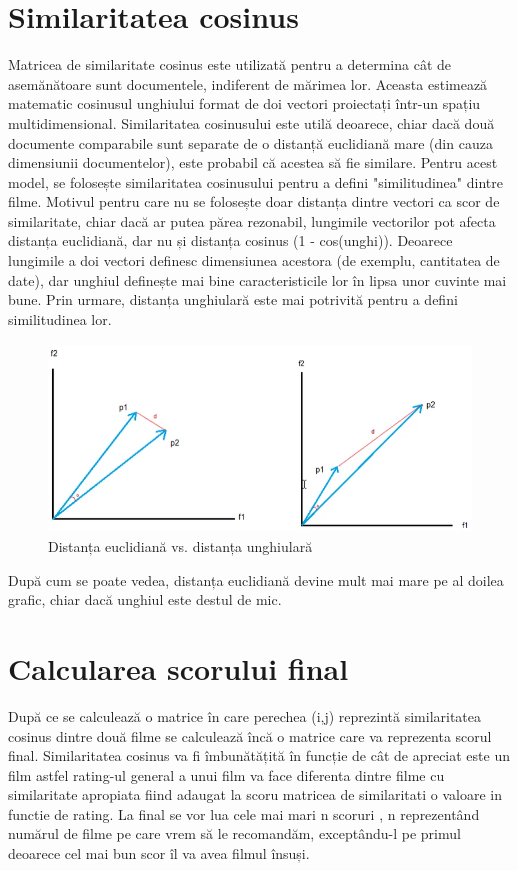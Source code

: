 \section{Similaritatea cosinus }
\par Matricea de similaritate cosinus este utilizată pentru a determina cât de asemănătoare sunt documentele, indiferent de mărimea lor. Aceasta estimează matematic cosinusul unghiului format de doi vectori proiectați într-un spațiu multidimensional. Similaritatea cosinusului este utilă deoarece, chiar dacă două documente comparabile sunt separate de o distanță euclidiană mare (din cauza dimensiunii documentelor), este probabil că acestea să fie similare. Pentru acest model, se folosește similaritatea cosinusului pentru a defini "similitudinea" dintre filme. Motivul pentru care nu se folosește doar distanța dintre vectori ca scor de similaritate, chiar dacă ar putea părea rezonabil, lungimile vectorilor pot afecta distanța euclidiană, dar nu și distanța cosinus (1 - cos(unghi)). Deoarece lungimile a doi vectori definesc dimensiunea acestora (de exemplu, cantitatea de date), dar unghiul definește mai bine caracteristicile lor în lipsa unor cuvinte mai bune. Prin urmare, distanța unghiulară este mai potrivită pentru a defini similitudinea lor.
		\begin{figure}[htbp]
			\centerline{\includegraphics[width=12cm, height=5cm]{figures/grafic distanta.png}}
			\caption{Distanța euclidiană vs. distanța unghiulară}
			\label{fig}
		\end{figure}
\par După cum se poate  vedea, distanța euclidiană devine mult mai mare pe al doilea grafic, chiar dacă unghiul este destul de mic.

\section{Calcularea scorului final}
\par După ce se calculează o matrice în care perechea (i,j) reprezintă similaritatea cosinus dintre două filme se calculează încă o matrice care va reprezenta scorul final. Similaritatea cosinus va fi îmbunătățită în funcție de cât de apreciat este un film astfel rating-ul general a unui film va face diferenta dintre filme cu similaritate apropiata fiind adaugat la scoru matricea de similaritati o valoare in functie de rating. La final se vor lua cele mai mari n scoruri , n reprezentând numărul de filme pe care vrem să le recomandăm, exceptându-l pe primul deoarece cel mai bun scor îl va avea filmul însuși.